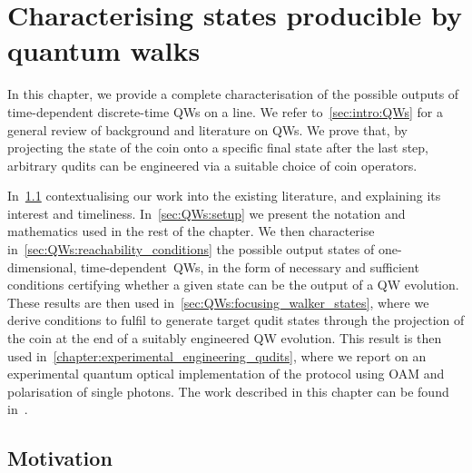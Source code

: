 
\chapter{Characterising states producible by quantum walks}
\label{chapter:quantum_walks}

In this chapter, we provide a complete characterisation of the possible outputs of time-dependent discrete-time \acfp{QW} on a line. We refer to~\cref{sec:intro:QWs} for a general review of background and literature on \acp{QW}.
We prove that, by projecting the state of the coin onto a specific final state after the last step, arbitrary qudits can be engineered via a suitable choice of coin operators.

In~\cref{sec:QWs:motivation} contextualising our work into the existing literature, and explaining its interest and timeliness.
In~\cref{sec:QWs:setup} we present the notation and mathematics used in the rest of the chapter.
We then characterise in~\cref{sec:QWs:reachability_conditions} the possible output states of one-dimensional, time-dependent~\acp{QW}, in the form of necessary and sufficient conditions certifying whether a given state can be the output of a \ac{QW} evolution.
These results are then used in~\cref{sec:QWs:focusing_walker_states}, where we derive conditions to fulfil to generate target qudit states through the projection of the coin at the end of a suitably engineered QW evolution.
This result is then used in~\cref{chapter:experimental_engineering_qudits}, where we report on an experimental quantum optical implementation of the protocol using \acf{OAM} and polarisation of single photons.
The work described in this chapter can be found in~\cite{innocenti2017quantum}.

\section{Motivation}
\label{sec:QWs:motivation}

